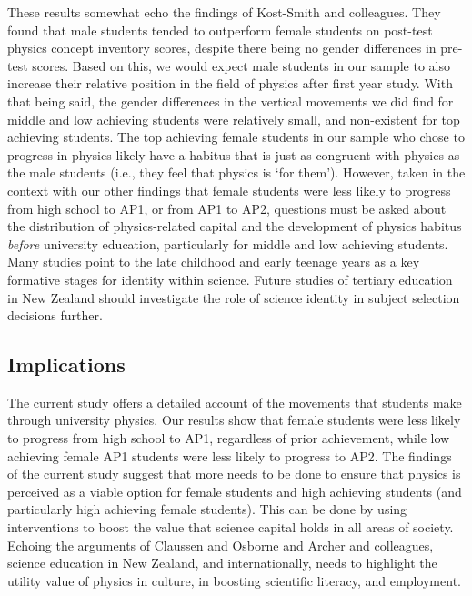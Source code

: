 These results somewhat echo the findings of Kost-Smith and colleagues.\cite{Kost_Smith_2010} They found that male students tended to outperform female students on post-test physics concept inventory scores, despite there being no gender differences in pre-test scores. Based on this, we would expect male students in our sample to also increase their relative position in the field of physics after first year study. With that being said, the gender differences in the vertical movements we did find for middle and low achieving students were relatively small, and non-existent for top achieving students. The top achieving female students in our sample who chose to progress in physics likely have a habitus that is just as congruent with physics as the male students (i.e., they feel that physics is `for them'). However, taken in the context with our other findings that female students were less likely to progress from high school to AP1, or from AP1 to AP2, questions must be asked about the distribution of physics-related capital and the development of physics habitus \textit{before} university education, particularly for middle and low achieving students. Many studies point to the late childhood and early teenage years as a key formative stages\cite{archer2013aspires,DeWitt2014,Baram_Tsabari_2010} for identity within science. Future studies of tertiary education in New Zealand should investigate the role of science identity in subject selection decisions further.

\subsection*{Implications}
The current study offers a detailed account of the movements that students make through university physics. Our results show that female students were less likely to progress from high school to AP1, regardless of prior achievement, while low achieving female AP1 students were less likely to progress to AP2. The findings of the current study suggest that more needs to be done to ensure that physics is perceived as a viable option for female students and high achieving students (and particularly high achieving female students). This can be done by using interventions to boost the value that science capital holds in all areas of society. Echoing the arguments of Claussen and Osborne\cite{Claussen_2013} and Archer and colleagues\cite{Archer2012}, science education in New Zealand, and internationally, needs to highlight the utility value of physics in culture, in boosting scientific literacy, and employment. 

